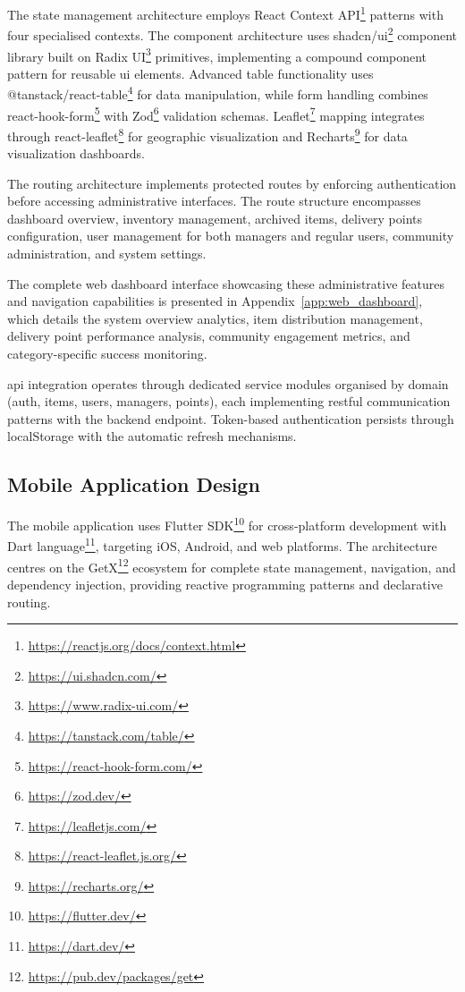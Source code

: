 The state management architecture employs React Context API\footnote{\url{https://reactjs.org/docs/context.html}} patterns with four specialised contexts. The component architecture uses shadcn/ui\footnote{\url{https://ui.shadcn.com/}} component library built on Radix UI\footnote{\url{https://www.radix-ui.com/}} primitives, implementing a compound component pattern for reusable \ac{ui} elements. Advanced table functionality uses @tanstack/react-table\footnote{\url{https://tanstack.com/table/}} for data manipulation, while form handling combines react-hook-form\footnote{\url{https://react-hook-form.com/}} with Zod\footnote{\url{https://zod.dev/}} validation schemas. Leaflet\footnote{\url{https://leafletjs.com/}} mapping integrates through react-leaflet\footnote{\url{https://react-leaflet.js.org/}} for geographic visualization and Recharts\footnote{\url{https://recharts.org/}} for data visualization dashboards.

The routing architecture implements protected routes by enforcing authentication before accessing administrative interfaces. The route structure encompasses dashboard overview, inventory management, archived items, delivery points configuration, user management for both managers and regular users, community administration, and system settings.

The complete web dashboard interface showcasing these administrative features and navigation capabilities is presented in Appendix~\ref{app:web_dashboard}, which details the system overview analytics, item distribution management, delivery point performance analysis, community engagement metrics, and category-specific success monitoring.

\ac{api} integration operates through dedicated service modules organised by domain (auth, items, users, managers, points), each implementing \ac{rest}ful communication patterns with the backend endpoint. Token-based authentication persists through localStorage with the automatic refresh mechanisms.

\subsection{Mobile Application Design} \label{subsection:mobile_application}

The mobile application uses Flutter SDK\footnote{\url{https://flutter.dev/}} for cross-platform development with Dart language\footnote{\url{https://dart.dev/}}, targeting iOS, Android, and web platforms. The architecture centres on the GetX\footnote{\url{https://pub.dev/packages/get}} ecosystem for complete state management, navigation, and dependency injection, providing reactive programming patterns and declarative routing.

